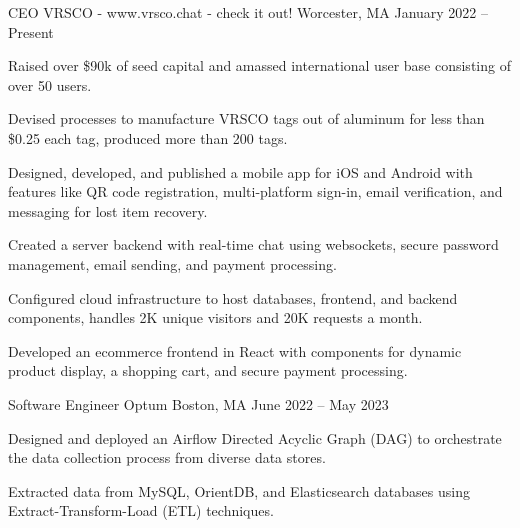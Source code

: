 

\begin{cventries}

  \cventry
    {CEO} %
    {VRSCO - www.vrsco.chat - check it out!} %
    {Worcester, MA} %
    {January 2022 – Present}
    {
      \begin{cvitems} %
      \item {Raised over \$90k of seed capital and amassed international user base consisting of over 50 users.}
      \item {Devised processes to manufacture VRSCO tags out of aluminum for less than \$0.25 each tag, produced more than 200 tags.}
      \item {Designed, developed, and published a mobile app for iOS and Android with features like QR code registration, multi-platform sign-in, email verification, and messaging for lost item recovery.}
      \item {Created a server backend with real-time chat using websockets, secure password management, email sending, and payment processing.}
      \item {Configured cloud infrastructure to host databases, frontend, and backend components, handles 2K unique visitors and 20K requests a month.}
      \item {Developed an ecommerce frontend in React with components for dynamic product display, a shopping cart, and secure payment processing.}
      \end{cvitems}
    }
  \cventry
    {Software Engineer} %
    {Optum} %
    {Boston, MA} %
    {June 2022 – May 2023} %
    {
      \begin{cvitems} %
        \item {Designed and deployed an Airflow Directed Acyclic Graph (DAG) to orchestrate the data collection process from diverse data stores.}
        \item {Extracted data from MySQL, OrientDB, and Elasticsearch databases using Extract-Transform-Load (ETL) techniques.}

\end{cvitems}}
\end{cventries}
